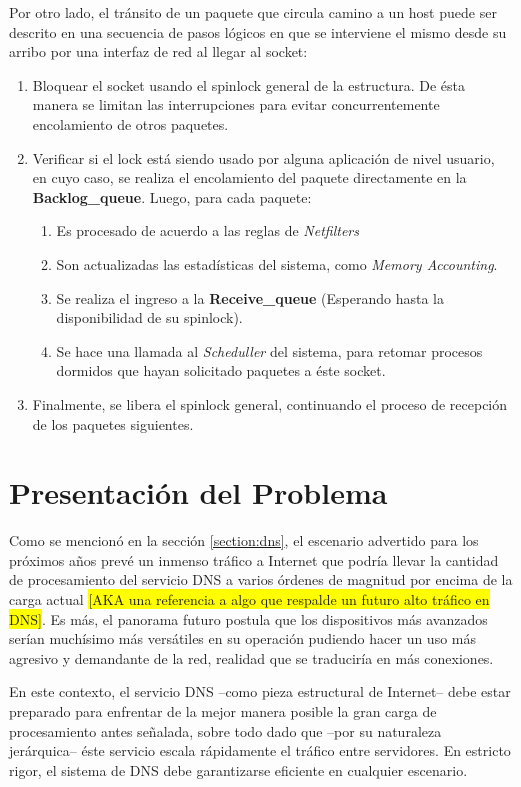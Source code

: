 Por otro lado, el tránsito de un paquete que circula camino a un host puede ser descrito en una secuencia de pasos lógicos en que se interviene el mismo desde su arribo por una interfaz de red al llegar al socket:
\begin{enumerate}
\item Bloquear el socket usando el spinlock general de la estructura. De ésta manera se limitan las interrupciones para evitar concurrentemente encolamiento de otros paquetes.
\item Verificar si el lock está siendo usado por alguna aplicación de nivel usuario, en cuyo caso, se realiza el encolamiento del paquete directamente en la \textbf{Backlog\_queue}. Luego, para cada paquete:
	\begin{enumerate}
	\item Es procesado de acuerdo a las reglas de \emph{Netfilters}
	\item Son actualizadas las estadísticas del sistema, como \emph{Memory Accounting}.
	\item Se realiza el ingreso a la \textbf{Receive\_queue} (Esperando hasta la disponibilidad de su spinlock).
	\item Se hace una llamada al \emph{Scheduller} del sistema, para retomar procesos dormidos que hayan solicitado paquetes a éste socket.
	\end{enumerate}
\item Finalmente, se libera el spinlock general, continuando el proceso de recepción de los paquetes siguientes.
\end{enumerate}

\section{Presentación del Problema}
Como se mencionó en la sección \ref{section:dns}, el escenario advertido para los próximos años prevé un inmenso tráfico a Internet que podría llevar la cantidad de procesamiento del servicio DNS a varios órdenes de magnitud por encima de la carga actual \colorbox{yellow}{[AKA una referencia a algo que respalde un futuro alto tráfico en DNS]}. Es más, el panorama futuro postula que los dispositivos más avanzados serían muchísimo más versátiles en su operación pudiendo hacer un uso más agresivo y demandante de la red, realidad que se traduciría en más conexiones.

En este contexto, el servicio DNS --como pieza estructural de Internet-- debe estar preparado para enfrentar de la mejor manera posible la gran carga de procesamiento antes señalada, sobre todo dado que --por su naturaleza jerárquica-- éste servicio escala rápidamente el tráfico entre servidores. En estricto rigor, el sistema de DNS debe garantizarse eficiente en cualquier escenario.

